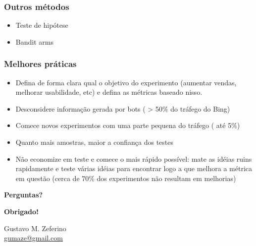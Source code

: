 \documentclass[xcolor=dvipsnames]{beamer}
\begin{document}
\begin{frame}%
\frametitle{Outros métodos}

\begin{itemize}
\item Teste de hipótese
\item Bandit arms
\end{itemize}

\end{frame}%


\begin{frame}%
\frametitle{Melhores práticas}

\begin{itemize}
\item Defina de forma clara qual o objetivo do experimento (aumentar vendas, melhorar usabilidade, etc) e defina as métricas baseado nisso.
\item Desconsidere informação gerada por bots ( > 50\% do tráfego do Bing)
\item Comece novos experimentos com uma parte pequena do tráfego ( até 5\%)
\item Quanto mais amostras, maior a confiança dos testes
\item Não economize em teste e comece o mais rápido possível: mate as idéias ruins rapidamente e teste várias idéias para encontrar logo a que melhora a métrica em questão (cerca de 70\% dos experimentos não resultam em melhorias)

\end{itemize}

\end{frame}%


\begin{frame}%

{\LARGE\textbf{Perguntas?}}

\end{frame}%


\begin{frame}%

\begin{center}
{\LARGE\textbf{Obrigado!}}

\vspace{20pt}
Gustavo M. Zeferino \\
\url{gumaze@gmail.com}
\end{center}


\end{frame}%


\end{document}
